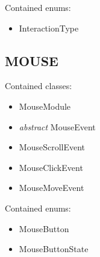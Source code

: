 Contained enums:
\begin{itemize}
\item InteractionType
\end{itemize}
\subsection*{MOUSE}
Contained classes:
\begin{itemize}
\item MouseModule
\item \textit{abstract} MouseEvent
\item MouseScrollEvent
\item MouseClickEvent
\item MouseMoveEvent
\end{itemize}

Contained enums:
\begin{itemize}
\item MouseButton
\item MouseButtonState
\end{itemize}
